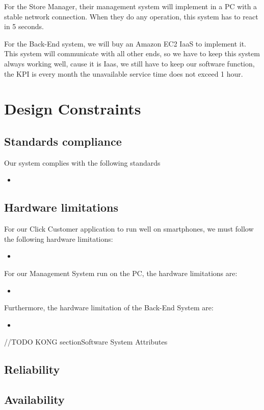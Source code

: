 \documentclass[a4paper,12pt]{report}
\begin{document}
For the Store Manager, their management system will implement in a PC with a stable network connection. When they do any operation, this system has to react in 5 seconds.

For the Back-End system, we will buy an Amazon EC2 IaaS to implement it. This system will communicate with all other ends, so we have to keep this system always working well, cause it is Iaas, we still have to keep our software function, the KPI is every month the unavailable service time does not exceed 1 hour.


\section{Design Constraints}
\subsection{Standards compliance}

Our system complies with the following standards
\begin{itemize}
	\item 
\end{itemize}


\subsection{Hardware limitations}

For our Click Customer application to run well on smartphones, we must follow the following hardware limitations:
\begin{itemize}
	\item 
\end{itemize}

For our Management System run on the PC, the hardware limitations are:
\begin{itemize}
	\item 
\end{itemize}

Furthermore, the hardware limitation of the Back-End System are:
\begin{itemize}
	\item 
\end{itemize}


//TODO KONG
section{Software System Attributes}
\subsection{Reliability} 

\subsection{Availability}
\end{document}
